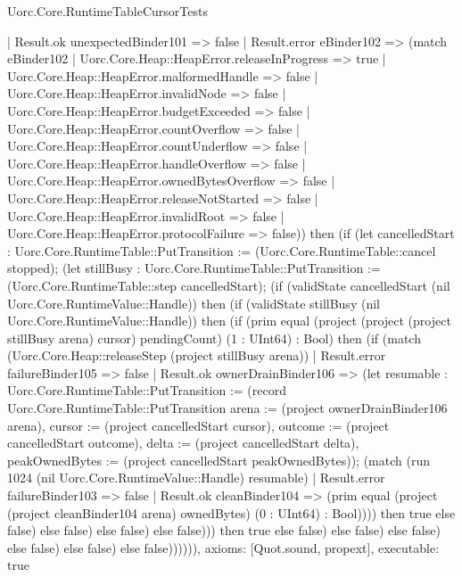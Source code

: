 \begin{lexlean}{Uorc.Core.RuntimeTableCursorTests}
\begin{semanticmodule}
{          | Result.ok unexpectedBinder101 => false
          | Result.error eBinder102 => (match eBinder102
            | Uorc.Core.Heap::HeapError.releaseInProgress => true
            | Uorc.Core.Heap::HeapError.malformedHandle => false
            | Uorc.Core.Heap::HeapError.invalidNode => false
            | Uorc.Core.Heap::HeapError.budgetExceeded => false
            | Uorc.Core.Heap::HeapError.countOverflow => false
            | Uorc.Core.Heap::HeapError.countUnderflow => false
            | Uorc.Core.Heap::HeapError.handleOverflow => false
            | Uorc.Core.Heap::HeapError.ownedBytesOverflow => false
            | Uorc.Core.Heap::HeapError.releaseNotStarted => false
            | Uorc.Core.Heap::HeapError.invalidRoot => false
            | Uorc.Core.Heap::HeapError.protocolFailure => false)) then (if (let cancelledStart : Uorc.Core.RuntimeTable::PutTransition := (Uorc.Core.RuntimeTable::cancel stopped); (let stillBusy : Uorc.Core.RuntimeTable::PutTransition := (Uorc.Core.RuntimeTable::step cancelledStart); (if (validState cancelledStart (nil Uorc.Core.RuntimeValue::Handle)) then (if (validState stillBusy (nil Uorc.Core.RuntimeValue::Handle)) then (if (prim equal (project (project (project stillBusy arena) cursor) pendingCount) (1 : UInt64) : Bool) then (if (match (Uorc.Core.Heap::releaseStep (project stillBusy arena))
          | Result.error failureBinder105 => false
          | Result.ok ownerDrainBinder106 => (let resumable : Uorc.Core.RuntimeTable::PutTransition := (record Uorc.Core.RuntimeTable::PutTransition {arena := (project ownerDrainBinder106 arena), cursor := (project cancelledStart cursor), outcome := (project cancelledStart outcome), delta := (project cancelledStart delta), peakOwnedBytes := (project cancelledStart peakOwnedBytes)}); (match (run 1024 (nil Uorc.Core.RuntimeValue::Handle) resumable)
            | Result.error failureBinder103 => false
            | Result.ok cleanBinder104 => (prim equal (project (project cleanBinder104 arena) ownedBytes) (0 : UInt64) : Bool)))) then true else false) else false) else false) else false))) then true else false) else false) else false) else false) else false) else false)))))),
  axioms: [Quot.sound, propext],
  executable: true
}


\end{semanticmodule}
\end{lexlean}
